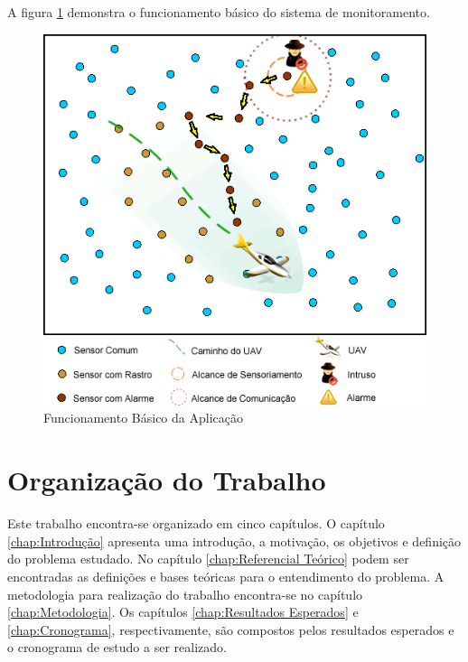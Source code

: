 A figura \ref{fig:app} demonstra o funcionamento básico do sistema de monitoramento.

\begin{figure}[h!]
\centering
\includegraphics[width=12cm]{pictures/application.png}
\caption{Funcionamento Básico da Aplicação}
 \label{fig:app}
\end{figure}




\section{Organização do Trabalho}

Este trabalho encontra-se organizado em cinco capítulos. O capítulo \ref{chap:Introdução} apresenta uma introdução, a motivação, os objetivos e definição do problema estudado. No capítulo \ref{chap:Referencial Teórico} podem ser encontradas as definições e bases teóricas para o entendimento do problema. A metodologia para realização do trabalho encontra-se no capítulo \ref{chap:Metodologia}. Os capítulos \ref{chap:Resultados Esperados} e \ref{chap:Cronograma}, respectivamente, são compostos pelos resultados esperados e o cronograma de estudo a ser realizado.


